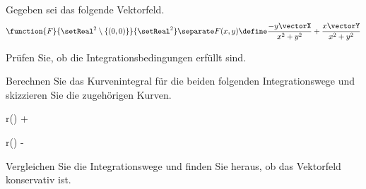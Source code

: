 \begin{atiTask}[
  title = Magnetfeld eines Leiters
]
  Gegeben sei das folgende Vektorfeld.
  \[
    \function{F}{\setReal^2\setminus\{(0,0)\}}{\setReal^2}
    \separate
    F(x,y)\define \frac{-y\vectorX}{x^2+y^2} + \frac{x\vectorY}{x^2+y^2}
  \]
  \begin{atiSubtasks}
    \item{
      Prüfen Sie, ob die Integrationsbedingungen erfüllt sind.
    }
    \item{
      Berechnen Sie das Kurvenintegral für die beiden folgenden Integrationswege und skizzieren Sie die zugehörigen Kurven.
      \begin{atiSubequations}
        \item{
          \separate
          r(\varphi)  \vectorX \cos\varphi + \vectorY \sin\varphi
        }
        \item{
          \separate
          r(\varphi)  \vectorX \cos\varphi - \vectorY \sin\varphi
        }
      \end{atiSubequations}
    }
    \item{
      Vergleichen Sie die Integrationswege und finden Sie heraus, ob das Vektorfeld konservativ ist.
    }
  \end{atiSubtasks}
\end{atiTask}